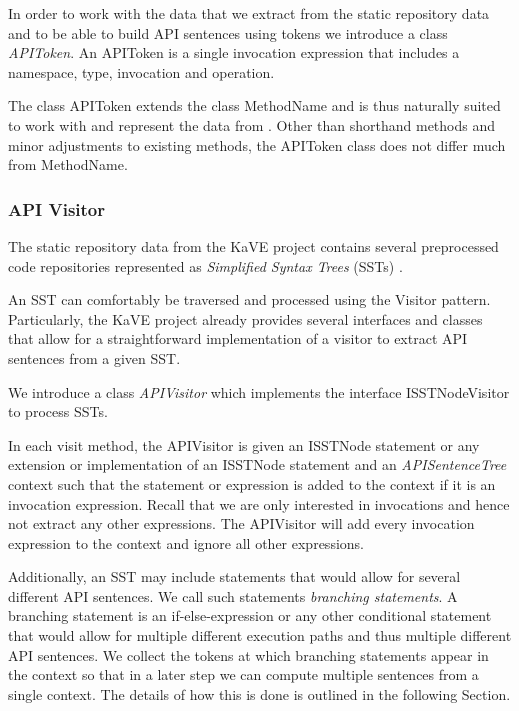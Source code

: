 In order to work with the data that we extract from the static repository data and to be able to build API sentences using tokens we introduce a class \textit{APIToken}.
An APIToken is a single invocation expression that includes a namespace, type, invocation and operation.

The class APIToken extends the class MethodName and is thus naturally suited to work with and represent the data from \cite{Kave}. Other than shorthand methods and minor adjustments to existing methods, the APIToken class does not differ much from MethodName.

\subsubsection{API Visitor}
\label{section-apivisitor}

The static repository data from the KaVE project contains several preprocessed code repositories represented as \textit{Simplified Syntax Trees} (SSTs) \cite{Kave}.

An SST can comfortably be traversed and processed using the Visitor pattern. Particularly, the KaVE project \cite{Kave} already provides several interfaces and classes that allow for a straightforward implementation of a visitor to extract API sentences from a given SST.

We introduce a class \textit{APIVisitor} which implements the interface ISSTNodeVisitor to process SSTs.

In each visit method, the APIVisitor is given an ISSTNode statement or any extension or implementation of an ISSTNode statement and an \textit{APISentenceTree} context such that the statement or expression is added to the context if it is an invocation expression. Recall that we are only interested in invocations and hence not extract any other expressions. The APIVisitor will add every invocation expression to the context and ignore all other expressions.

Additionally, an SST may include statements that would allow for several different API sentences. We call such statements \textit{branching statements}. A branching statement is an if-else-expression or any other conditional statement that would allow for multiple different execution paths and thus multiple different API sentences. We collect the tokens at which branching statements appear in the context so that in a later step we can compute multiple sentences from a single context. The details of how this is done is outlined in the following Section.


